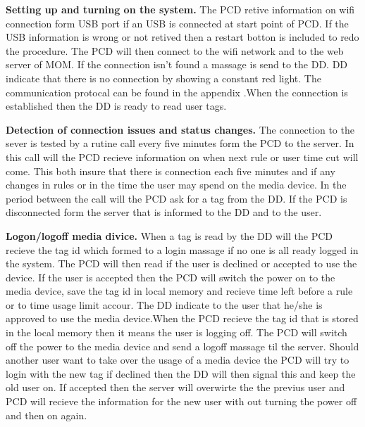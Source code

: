 \textbf{Setting up and turning on the system.} \n
The PCD retive information on wifi connection form USB port if an USB is connected at start point of PCD. 
If the USB information is wrong or not retived then a restart botton is included to redo the procedure.  \n
The PCD will then connect to the wifi network and to the web server of MOM. If the connection isn't found a massage is send to the DD. \n DD indicate that there is no connection by showing a constant red light. The communication protocal can be found in the appendix  .\n When the connection is established then the DD is ready to read user tags.

\textbf{Detection of connection issues and status changes.} \n
The connection to the sever is tested by a rutine call every five minutes form the PCD to the server. In this call will the PCD recieve information on when next rule or user time cut will come. This both insure that there is connection each five minutes and if any changes in rules or in the time the user may spend on the media device. In the period between the call will the PCD ask for a tag from the DD. If the PCD is disconnected form the server that is informed to the DD and to the user.  
	
\textbf{Logon/logoff media divice.} \n
When a tag is read by the DD will the PCD recieve the tag id which formed to a login massage if no one is all ready logged in the system. The PCD will then read if the user is declined or accepted to use the device. If the user is accepted then the PCD will switch the power on to the media device, save the tag id in local memory and recieve time left before a rule or to time usage limit accour. The DD indicate to the user that he/she is approved to use the media device.\n When the PCD recieve the tag id that is stored in the local memory then it means the user is logging off. The PCD will switch off the power to the media device and send a logoff massage til the server. Should another user want to take over the usage of a media device the PCD will try to login with the new tag if declined then the DD will then signal this and keep the old user on. If accepted then the server will overwirte the the previus user and PCD will recieve the information for the new user with out turning the power off and then on again.


